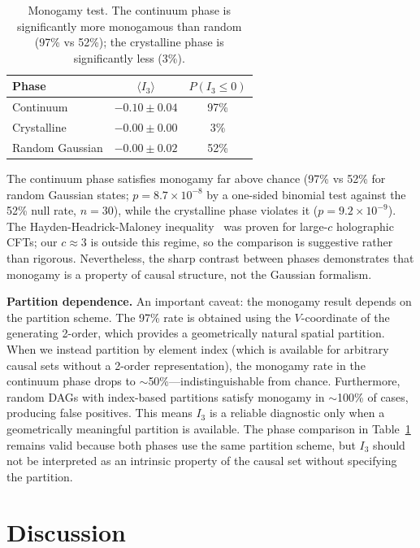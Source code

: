 \documentclass[aps,prd,twocolumn,superscriptaddress,nofootinbib]{revtex4-2}
\begin{document}
\begin{table}[h]
\centering
\begin{tabular}{lcc}
\toprule
Phase & $\langle I_3 \rangle$ & $P(I_3 \leq 0)$ \\
\midrule
Continuum & $-0.10 \pm 0.04$ & 97\% \\
Crystalline & $-0.00 \pm 0.00$ & 3\% \\
Random Gaussian & $-0.00 \pm 0.02$ & 52\% \\
\bottomrule
\end{tabular}
\caption{Monogamy test. The continuum phase is significantly more monogamous than random (97\% vs 52\%); the crystalline phase is significantly less (3\%).}
\label{tab:monogamy}
\end{table}

The continuum phase satisfies monogamy far above chance (97\% vs 52\% for random Gaussian states; $p = 8.7 \times 10^{-8}$ by a one-sided binomial test against the 52\% null rate, $n = 30$), while the crystalline phase violates it ($p = 9.2 \times 10^{-9}$). The Hayden-Headrick-Maloney inequality~\cite{hayden2013} was proven for large-$c$ holographic CFTs; our $c \approx 3$ is outside this regime, so the comparison is suggestive rather than rigorous. Nevertheless, the sharp contrast between phases demonstrates that monogamy is a property of causal structure, not the Gaussian formalism.

\textbf{Partition dependence.} An important caveat: the monogamy result depends on the partition scheme. The 97\% rate is obtained using the $V$-coordinate of the generating 2-order, which provides a geometrically natural spatial partition. When we instead partition by element index (which is available for arbitrary causal sets without a 2-order representation), the monogamy rate in the continuum phase drops to $\sim$50\%---indistinguishable from chance. Furthermore, random DAGs with index-based partitions satisfy monogamy in $\sim$100\% of cases, producing false positives. This means $I_3$ is a reliable diagnostic only when a geometrically meaningful partition is available. The phase comparison in Table~\ref{tab:monogamy} remains valid because both phases use the same partition scheme, but $I_3$ should not be interpreted as an intrinsic property of the causal set without specifying the partition.

\section{Discussion}
\end{document}
